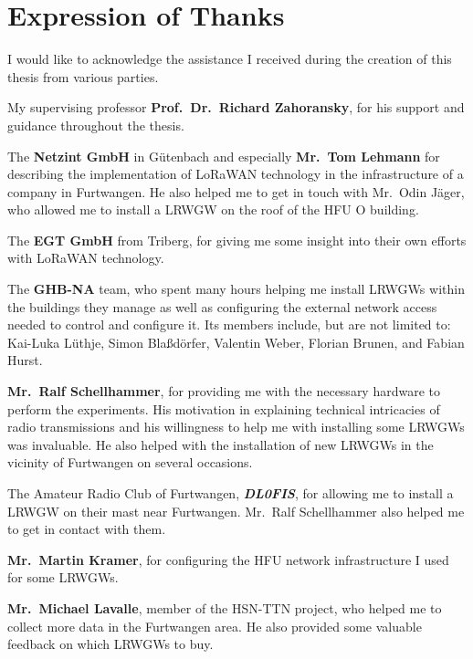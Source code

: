 \section{Expression of Thanks}\label{sec:expression-of-thanks}

I would like to acknowledge the assistance I received during the creation of this thesis from various parties.

My supervising professor \textbf{Prof.\ Dr.\ Richard Zahoransky}, for his support and guidance throughout the thesis.

The \textbf{Netzint GmbH} in Gütenbach and especially \textbf{Mr.\ Tom Lehmann} for describing the implementation of \ac{LoRaWAN} technology in the infrastructure of a company in Furtwangen.
He also helped me to get in touch with Mr.\ Odin Jäger, who allowed me to install a \acl{LRWGW} on the roof of the \ac{HFU} O building.

The \textbf{EGT GmbH} from Triberg, for giving me some insight into their own efforts with \ac{LoRaWAN} technology.

The \textbf{\acl{GHB-NA}} team, who spent many hours helping me install \aclp{LRWGW} within the buildings they manage as well as configuring the external network access needed to control and configure it.
Its members include, but are not limited to: Kai-Luka Lüthje, Simon Blaßdörfer, Valentin Weber, Florian Brunen, and Fabian Hurst.

\textbf{Mr.\ Ralf Schellhammer}, for providing me with the necessary hardware to perform the experiments.
His motivation in explaining technical intricacies of radio transmissions and his willingness to help me with installing some \aclp{LRWGW} was invaluable.
He also helped with the installation of new \aclp{LRWGW} in the vicinity of Furtwangen on several occasions.

The Amateur Radio Club of Furtwangen, \textbf{\emph{DL0FIS}}, for allowing me to install a \acl{LRWGW} on their mast near Furtwangen.
Mr.\ Ralf Schellhammer also helped me to get in contact with them.

\textbf{Mr.\ Martin Kramer}, for configuring the \ac{HFU} network infrastructure I used for some \aclp{LRWGW}.

\textbf{Mr.\ Michael Lavalle}, member of the \ac{HSN-TTN} project, who helped me to collect more data in the Furtwangen area.
He also provided some valuable feedback on which \aclp{LRWGW} to buy.

